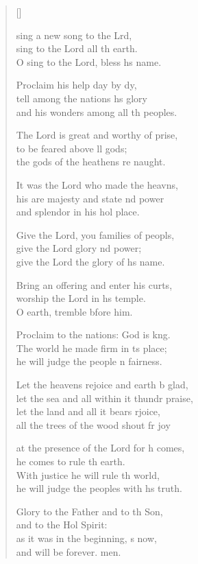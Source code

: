 \settowidth{\versewidth}{let the sea and all within it thunder praise,}
\begin{verse}[\versewidth]
  \begin{patverse}
 sing a new song to the Lrd,\Flex\\
sing to the Lord all th earth.\Med\\
O sing to the Lord, bless h\pointup{\i}s name.

Proclaim his help day by dy,\Flex\\
tell among the nations h\pointup{\i}s glory\Med\\
and his wonders among all th peoples.

The Lord is great and worthy of prise,\Flex\\
to be feared above ll gods;\Med\\
the gods of the heathens re naught.

It was the Lord who made the heavns,\Flex\\
his are majesty and state nd power\Med\\
and splendor in his hol place.

Give the Lord, you families of peopls,\Flex\\
give the Lord glory nd power;\Med\\
give the Lord the glory of h\pointup{\i}s name.

Bring an offering and enter his curts,\Flex\\
worship the Lord in h\pointup{\i}s temple.\Med\\
O earth, tremble bfore him.

Proclaim to the nations: God is k\pointup{\i}ng.\Flex\\
The world he made firm in \pointup{\i}ts place;\Med\\
he will judge the people \pointup{\i}n fairness.

Let the heavens rejoice and earth b glad,\Med\\
let the sea and all within it thundr praise,\\
let the land and all it bears rjoice,\Med\\
all the trees of the wood shout fr joy

at the presence of the Lord for h comes,\Med\\
he comes to rule th earth.\\
With justice he will rule th world,\Med\\
he will judge the peoples with h\pointup{\i}s truth.

Glory to the Father and to th Son,\Med\\
and to the Hol Spirit:\\
as it was in the beginning, \pointup{\i}s now,\Med\\
and will be forever. men. 
  \end{patverse}
\end{verse}

